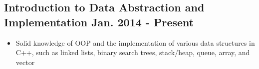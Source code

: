 \documentclass[10pt]{article}
\begin{document}
\begin{minipage}[t]{0.84\linewidth}
	\subsection*{Introduction to Data Abstraction and Implementation \hspace{32pt} \textnormal{Jan. 2014 - Present}} \vspace{-6pt}
		\begin{itemize}
			\item Solid knowledge of OOP and the implementation of various data structures in C++, such as linked lists, binary search trees, stack/heap, queue, array, and vector
		\end{itemize}
\end{minipage}
\end{document}
